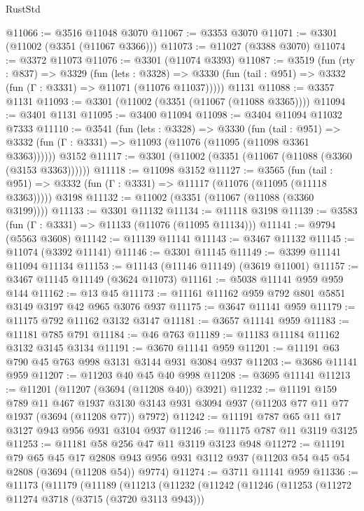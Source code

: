 \begin{lexlean}{RustStd}
\begin{coremodule}
@11066 := @3516 @11048 @3070
@11067 := @3353 @3070
@11071 := @3301 (@11002 (@3351 (@11067 @3366)))
@11073 := @11027 (@3388 @3070)
@11074 := @3372 @11073
@11076 := @3301 (@11074 @3393)
@11087 := @3519
    (fun (rty : @837) =>
    @3329
      (fun (lets : @3328) =>
      @3330 (fun (tail : @951) => @3332 (fun (Γ : @3331) => @11071 (@11076 @11037)))))
    @1131
@11088 := @3357 @1131
@11093 := @3301 (@11002 (@3351 (@11067 (@11088 @3365))))
@11094 := @3401 @1131
@11095 := @3400 @11094
@11098 := @3404 @11094 @11032 @7333
@11110 := @3541
    (fun (lets : @3328) =>
    @3330
      (fun (tail : @951) =>
      @3332 (fun (Γ : @3331) => @11093 (@11076 (@11095 (@11098 @3361 @3363))))))
    @3152
@11117 := @3301 (@11002 (@3351 (@11067 (@11088 (@3360 (@3153 @3363))))))
@11118 := @11098 @3152
@11127 := @3565
    (fun (tail : @951) => @3332 (fun (Γ : @3331) => @11117 (@11076 (@11095 (@11118 @3363)))))
    @3198
@11132 := @11002 (@3351 (@11067 (@11088 (@3360 @3199))))
@11133 := @3301 @11132
@11134 := @11118 @3198
@11139 := @3583 (fun (Γ : @3331) => @11133 (@11076 (@11095 @11134)))
@11141 := @9794 (@5563 @3608)
@11142 := @11139 @11141
@11143 := @3467 @11132
@11145 := @11074 (@3392 @11141)
@11146 := @3301 @11145
@11149 := @3399 @11141 @11094 @11134
@11153 := @11143 (@11146 @11149) (@3619 @11001)
@11157 := @3467 @11145 @11149 (@3624 @11073)
@11161 := @5038 @11141 @959 @959 @144
@11162 := @13 @45
@11173 := @11161 @11162 @959 @792 @801 @5851 @3149 @3197 @42 @965 @3076 @937
@11175 := @3647 @11141 @959
@11179 := @11175 @792 @11162 @3132 @3147
@11181 := @3657 @11141 @959
@11183 := @11181 @785 @791
@11184 := @46 @763
@11189 := @11183 @11184 @11162 @3132 @3145 @3134
@11191 := @3670 @11141 @959
@11201 := @11191 @63 @790 @45 @763 @998 @3131 @3144 @931 @3084 @937
@11203 := @3686 @11141 @959
@11207 := @11203 @40 @45 @40 @998
@11208 := @3695 @11141
@11213 := @11201 (@11207 (@3694 (@11208 @40)) @3921)
@11232 := @11191
    @159
    @789
    @11
    @467
    @1937
    @3130
    @3143
    @931
    @3094
    @937
    (@11203 @77 @11 @77 @1937 (@3694 (@11208 @77)) @7972)
@11242 := @11191 @787 @65 @11 @17 @3127 @943 @956 @931 @3104 @937
@11246 := @11175 @787 @11 @3119 @3125
@11253 := @11181 @58 @256 @47 @11 @3119 @3123 @948
@11272 := @11191
    @79
    @65
    @45
    @17
    @2808
    @943
    @956
    @931
    @3112
    @937
    (@11203 @54 @45 @54 @2808 (@3694 (@11208 @54)) @9774)
@11274 := @3711 @11141 @959
@11336 := @11173
    (@11179
      (@11189
        (@11213
          (@11232
            (@11242
              (@11246
                (@11253
                  (@11272 @11274 @3718 (@3715 (@3720 @3113 @943)))

\end{coremodule}
\end{lexlean}
